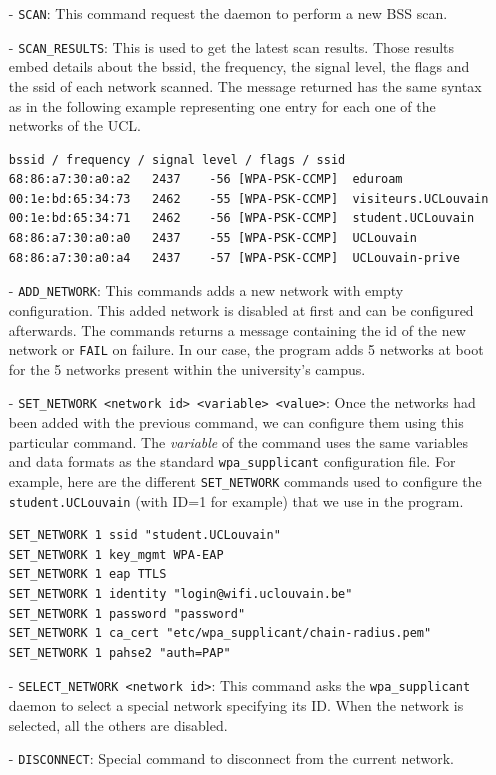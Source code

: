 \begin{itemize}
	\item[-] \texttt{SCAN}: This command request the daemon to perform a new BSS scan.

	\item[-] \texttt{SCAN\_RESULTS}: This is used to get the latest scan results. Those results embed details about the bssid, the frequency, the signal level, the flags and the ssid of each network scanned. The message returned has the same syntax as in the following example representing one entry for each one of the networks of the UCL.\\

\begin{lstlisting}[frame=single,breaklines=true,caption={Scan results message exemple}]
bssid / frequency / signal level / flags / ssid
68:86:a7:30:a0:a2	2437	-56	[WPA-PSK-CCMP]	eduroam
00:1e:bd:65:34:73	2462	-55	[WPA-PSK-CCMP]	visiteurs.UCLouvain
00:1e:bd:65:34:71 	2462	-56	[WPA-PSK-CCMP]	student.UCLouvain
68:86:a7:30:a0:a0 	2437	-55	[WPA-PSK-CCMP]	UCLouvain
68:86:a7:30:a0:a4 	2437	-57	[WPA-PSK-CCMP]	UCLouvain-prive
\end{lstlisting}

	\item[-] \texttt{ADD\_NETWORK}: This commands adds a new network with empty configuration. This added network is disabled at first and can be configured afterwards. The commands returns a message containing the id of the new network or \texttt{FAIL} on failure. In our case, the program adds 5 networks at boot for the 5 networks present within the university's campus.

	\item[-] \texttt{SET\_NETWORK <network id> <variable> <value>}: Once the networks had been added with the previous command, we can configure them using this particular command. The \textit{variable} of the command uses the same variables and data formats as the standard \texttt{wpa\_supplicant} configuration file. For example, here are the different \texttt{SET\_NETWORK} commands used to configure the \texttt{student.UCLouvain} (with ID=1 for example) that we use in the program.\\

\begin{lstlisting}[frame=single,breaklines=true,caption={Configuration of the \texttt{student.UCLouvain} network}]
SET_NETWORK 1 ssid "student.UCLouvain"
SET_NETWORK 1 key_mgmt WPA-EAP
SET_NETWORK 1 eap TTLS
SET_NETWORK 1 identity "login@wifi.uclouvain.be"
SET_NETWORK 1 password "password"
SET_NETWORK 1 ca_cert "etc/wpa_supplicant/chain-radius.pem"
SET_NETWORK 1 pahse2 "auth=PAP"
\end{lstlisting}

	\item[-] \texttt{SELECT\_NETWORK <network id>}: This command asks the \texttt{wpa\_supplicant} daemon to select a special network specifying its ID. When the network is selected, all the others are disabled.

	\item[-] \texttt{DISCONNECT}: Special command to disconnect from the current network.
\end{itemize}

